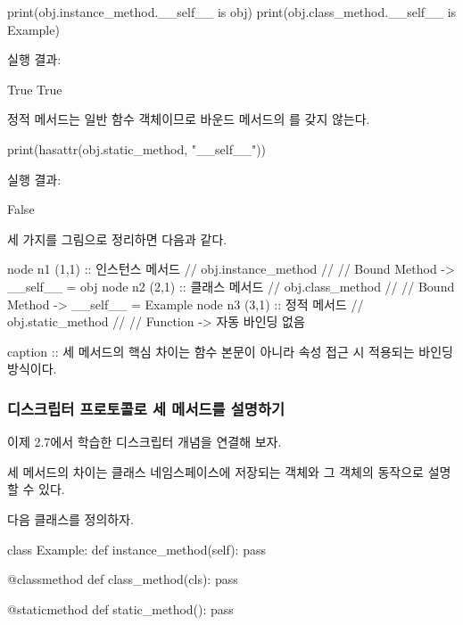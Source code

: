 \begin{dhkcode}
print(obj.instance_method.__self__ is obj)
print(obj.class_method.__self__ is Example)
\end{dhkcode}

실행 결과:

\begin{dhkzsh}
True
True
\end{dhkzsh}

정적 메서드는 일반 함수 객체이므로 바운드 메서드의 를 갖지 않는다.

\begin{dhkcode}
print(hasattr(obj.static_method, "__self__"))
\end{dhkcode}

실행 결과:

\begin{dhkzsh}
False
\end{dhkzsh}

세 가지를 그림으로 정리하면 다음과 같다.

\begin{dhkgraph}[uniform]
node n1 (1,1) :: 인스턴스 메서드 // obj.instance_method // \da // Bound Method -> __self__ = obj
node n2 (2,1) :: 클래스 메서드 // obj.class_method // \da // Bound Method -> __self__ = Example
node n3 (3,1) :: 정적 메서드 // obj.static_method // \da // Function -> 자동 바인딩 없음

caption :: 세 메서드의 핵심 차이는 함수 본문이 아니라 속성 접근 시 적용되는 바인딩 방식이다.
\end{dhkgraph}

\subsubsection{디스크립터 프로토콜로 세 메서드를 설명하기}

이제 2.7에서 학습한 디스크립터 개념을 연결해 보자.

세 메서드의 차이는 클래스 네임스페이스에 저장되는 객체와 그 객체의  동작으로 설명할 수 있다.

다음 클래스를 정의하자.

\begin{dhkcode}
class Example:
    def instance_method(self):
        pass

    @classmethod
    def class_method(cls):
        pass

    @staticmethod
    def static_method():
        pass
\end{dhkcode}

